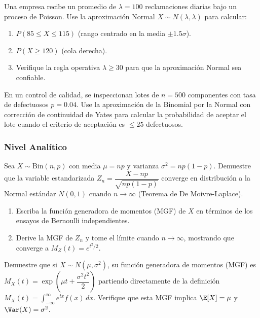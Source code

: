 \begin{problema}
	\label{prob:3.9.5}
	Una empresa recibe un promedio de $\lambda = 100$ reclamaciones diarias bajo un proceso de Poisson. Use la aproximación Normal $X \sim N(\lambda, \lambda)$ para calcular:
	\begin{enumerate}
		\item $P(85 \le X \le 115)$ (rango centrado en la media $\pm 1.5\sigma$).
		\item $P(X \ge 120)$ (cola derecha).
		\item Verifique la regla operativa $\lambda \ge 30$ para que la aproximación Normal sea confiable.
	\end{enumerate}
\end{problema}

\begin{problema}
	\label{prob:3.9.6}
	En un control de calidad, se inspeccionan lotes de $n = 500$ componentes con tasa de defectuosos $p = 0.04$. Use la aproximación de la Binomial por la Normal con corrección de continuidad de Yates para calcular la probabilidad de aceptar el lote cuando el criterio de aceptación es $\le 25$ defectuosos.
\end{problema}

\subsubsection*{Nivel Analítico}

\begin{problema}
	\label{prob:3.9.7}
	Sea $X \sim \text{Bin}(n, p)$ con media $\mu = np$ y varianza $\sigma^{2} = np(1-p)$. Demuestre que la variable estandarizada $Z_{n} = \dfrac{X - np}{\sqrt{np(1-p)}}$ converge en distribución a la Normal estándar $N(0, 1)$ cuando $n \to \infty$ (Teorema de De Moivre-Laplace).
	\begin{enumerate}
		\item Escriba la función generadora de momentos (MGF) de $X$ en términos de los ensayos de Bernoulli independientes.
		\item Derive la MGF de $Z_{n}$ y tome el límite cuando $n \to \infty$, mostrando que converge a $M_{Z}(t) = e^{t^{2}/2}$.
	\end{enumerate}
\end{problema}

\begin{problema}
	\label{prob:3.9.8}
	Demuestre que si $X \sim N(\mu, \sigma^{2})$, su función generadora de momentos (MGF) es $M_{X}(t) = \exp\left(\mu t + \dfrac{\sigma^{2} t^{2}}{2}\right)$ partiendo directamente de la definición $M_{X}(t) = \int_{-\infty}^{\infty} e^{tx} f(x)\,dx$. Verifique que esta MGF implica $\E[X] = \mu$ y $\Var(X) = \sigma^{2}$.
\end{problema}

